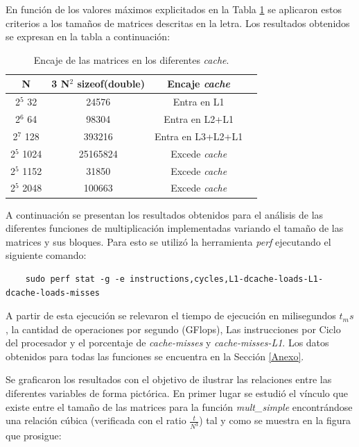 \documentclass[11pt]{article}
\begin{document}
En función de los valores máximos explicitados en la Tabla \ref{Tab:Ej2:Nmax} se aplicaron estos criterios a los tamaños de matrices descritas en la letra. Los resultados obtenidos se expresan en la tabla a continuación:

\begin{table}[h]
    \centering
    \begin{tabular}{||c|c|c|c||}
        \hline
           N  &3 N$^2$ sizeof(double) & Encaje \emph{cache}   \\[0.5ex]  \hline\hline
        2$^5$  32   & 24576 & Entra en L1   \\ \hline
        2$^6$  64   & 98304 & Entra en L2+L1   \\ \hline
        2$^7$  128   & 393216 & Entra en L3+L2+L1   \\ \hline
        2$^5$  1024   & 25165824 & Excede \emph{cache}   \\ \hline
        2$^5$  1152   & 31850 &Excede \emph{cache}    \\ \hline
        2$^5$  2048   & 100663 & Excede \emph{cache}     \\ \hline
    \end{tabular}
    \caption{Encaje de las matrices en los diferentes \emph{cache}. }
    \label{Tab:Ej2:Nmax}
\end{table}

A continuación se presentan los resultados obtenidos para el análisis de las diferentes funciones de multiplicación implementadas variando el tamaño de las matrices y sus bloques. Para esto se utilizó la herramienta \emph{perf} ejecutando el siguiente comando:

\begin{verbatim}
    sudo perf stat -g -e instructions,cycles,L1-dcache-loads-L1-dcache-loads-misses 
\end{verbatim}


A partir de esta ejecución se relevaron el tiempo de ejecución en milisegundos $t_ms$, la cantidad de operaciones por segundo (GFlops), Las instrucciones por Ciclo del procesador y el porcentaje de \emph{cache-misses}  y \emph{cache-misses-L1}. Los datos obtenidos para todas las funciones se encuentra en la Sección \ref{Anexo}.

Se graficaron los resultados con el objetivo de ilustrar las relaciones entre las diferentes variables de forma pictórica. En primer lugar se estudió el vínculo que existe entre el tamaño de las matrices para la función  \emph{mult\_simple} encontrándose una relación cúbica (verificada con el ratio $\frac{t}{N^3}$) tal y como se muestra en la figura que prosigue:
\end{document}
